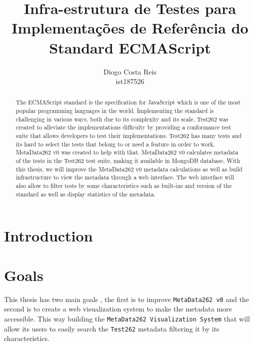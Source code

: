 \documentclass[runningheads]{llncs}
\title{Infra-estrutura de Testes para Implementações de Referência do Standard ECMAScript}
\subtitle{}
\author{Diogo Costa Reis\\ist187526\\
\email{diogo.costa.reis@tecnico.ulisboa.pt}}
\institute{Instituto Superior Técnico\\
Av. Rovisco Pais, 1\\
1049-001 Lisboa\\
Tel: +351 218 417 000\\
\email{mail@tecnico.ulisboa.pt}}
\begin{document}
{\def\addcontentsline#1#2#3{}\maketitle}

%
\begin{abstract}
The ECMAScript standard is the specification for JavaScript which is one of the most popular programming languages in the world. Implementing the standard is challenging in various ways, both due to its complexity and its scale. Test262 was created to alleviate the implementations difficulty by providing a conformance test suite that allows developers to test their implementations. Test262 has many tests and its hard to select the tests that belong to or need a feature in order to work, MetaData262 v0 was created to help with that. MetaData262 v0 calculates metadata of the tests in the Test262 test suite, making it available in MongoDB database. With this thesis, we will improve the MetaData262 v0 metadata calculations as well as build infrastructure to view the metadata through a web interface. The web interface will also allow to filter tests by some characteristics such as built-ins and version of the standard as well as display statistics of the metadata.

\end{abstract}


\newpage

\tableofcontents

\newpage

\section{Introduction}
\label{sec:Introduction}

\section{Goals}
\label{sec:Goals}


This thesis has two main goals , the first is to improve \texttt{MetaData262 v0} and the second is to create a web visualization system to make the metadata more accessible. This way building the \texttt{MetaData262 Visualization System} that will allow its users to easily search the \texttt{Test262} metadata  filtering it by its characteristics.
\end{document}
